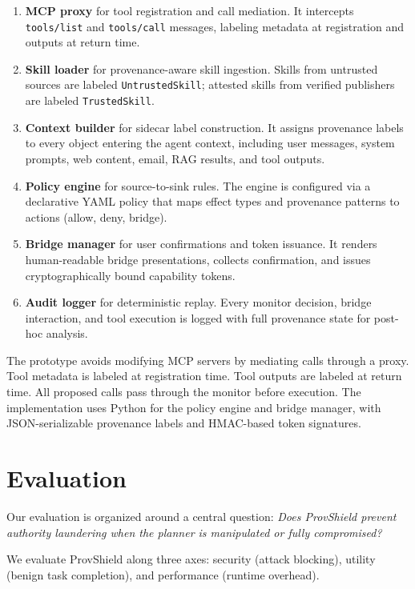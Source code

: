 \documentclass[sigconf,anonymous,review]{acmart}
\begin{document}
\begin{enumerate}
  \item \textbf{MCP proxy} for tool registration and call mediation. It intercepts \texttt{tools/list} and \texttt{tools/call} messages, labeling metadata at registration and outputs at return time.
  \item \textbf{Skill loader} for provenance-aware skill ingestion. Skills from untrusted sources are labeled \texttt{UntrustedSkill}; attested skills from verified publishers are labeled \texttt{TrustedSkill}.
  \item \textbf{Context builder} for sidecar label construction. It assigns provenance labels to every object entering the agent context, including user messages, system prompts, web content, email, RAG results, and tool outputs.
  \item \textbf{Policy engine} for source-to-sink rules. The engine is configured via a declarative YAML policy that maps effect types and provenance patterns to actions (allow, deny, bridge).
  \item \textbf{Bridge manager} for user confirmations and token issuance. It renders human-readable bridge presentations, collects confirmation, and issues cryptographically bound capability tokens.
  \item \textbf{Audit logger} for deterministic replay. Every monitor decision, bridge interaction, and tool execution is logged with full provenance state for post-hoc analysis.
\end{enumerate}

The prototype avoids modifying MCP servers by mediating calls through a proxy. Tool metadata is labeled at registration time. Tool outputs are labeled at return time. All proposed calls pass through the monitor before execution. The implementation uses Python for the policy engine and bridge manager, with JSON-serializable provenance labels and HMAC-based token signatures.

\section{Evaluation}
\label{sec:evaluation}

Our evaluation is organized around a central question: \emph{Does ProvShield prevent authority laundering when the planner is manipulated or fully compromised?}

We evaluate ProvShield along three axes: security (attack blocking), utility (benign task completion), and performance (runtime overhead).
\end{document}
